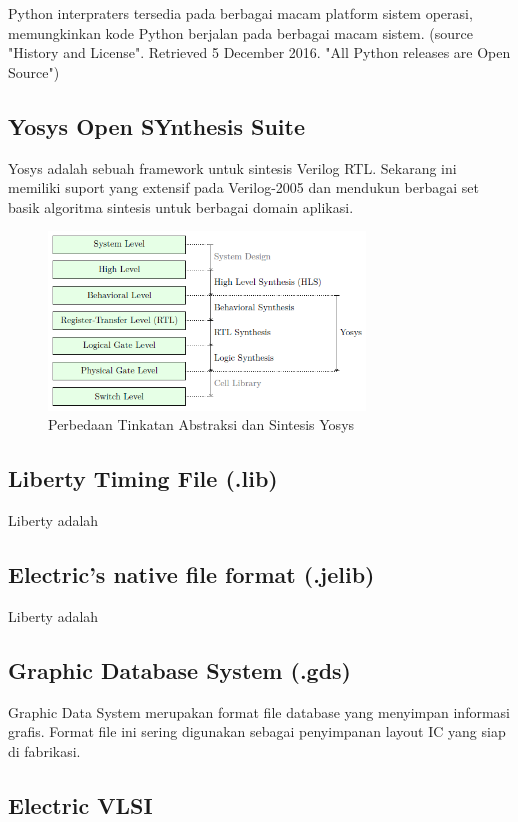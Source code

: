 Python interpraters tersedia pada berbagai macam platform sistem operasi, memungkinkan kode Python berjalan pada berbagai macam sistem. (source "History and License". Retrieved 5 December 2016. "All Python releases are Open Source")

\subsection{Yosys Open SYnthesis Suite}
Yosys adalah sebuah framework untuk sintesis Verilog RTL. Sekarang ini memiliki suport yang extensif pada Verilog-2005 dan mendukun berbagai set basik algoritma sintesis untuk berbagai domain aplikasi.

\begin{figure}
	\centering
	\includegraphics[width=0.75\textwidth]
	{pics/yosys.png}
	\caption{Perbedaan Tinkatan Abstraksi dan Sintesis Yosys}
	\label{yosys}
\end{figure}

\subsection{Liberty Timing File (.lib)}
Liberty adalah

\subsection{Electric's native file format (.jelib)}
Liberty adalah

\subsection{Graphic Database System (.gds)}
Graphic Data System merupakan format file database yang menyimpan informasi grafis. Format file ini sering digunakan sebagai penyimpanan layout IC yang siap di fabrikasi.

\subsection{Electric VLSI}

